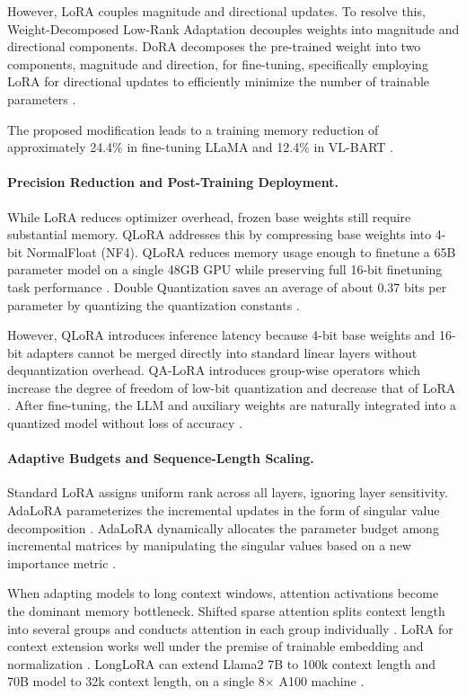 \documentclass[11pt,a4paper]{article}
\begin{document}
However, LoRA couples magnitude and directional updates. To resolve this, Weight-Decomposed Low-Rank Adaptation decouples weights into magnitude and directional components. DoRA decomposes the pre-trained weight into two components, magnitude and direction, for fine-tuning, specifically employing LoRA for directional updates to efficiently minimize the number of trainable parameters \cite{liu2024dora}.

The proposed modification leads to a training memory reduction of approximately 24.4\% in fine-tuning LLaMA and 12.4\% in VL-BART \cite{liu2024dora}.

\paragraph{Precision Reduction and Post-Training Deployment.}
While LoRA reduces optimizer overhead, frozen base weights still require substantial memory. QLoRA addresses this by compressing base weights into 4-bit NormalFloat (NF4). QLoRA reduces memory usage enough to finetune a 65B parameter model on a single 48GB GPU while preserving full 16-bit finetuning task performance \cite{dettmers2023qlora}. Double Quantization saves an average of about 0.37 bits per parameter by quantizing the quantization constants \cite{dettmers2023qlora}. 

However, QLoRA introduces inference latency because 4-bit base weights and 16-bit adapters cannot be merged directly into standard linear layers without dequantization overhead. QA-LoRA introduces group-wise operators which increase the degree of freedom of low-bit quantization and decrease that of LoRA \cite{xu2023qa}. After fine-tuning, the LLM and auxiliary weights are naturally integrated into a quantized model without loss of accuracy \cite{xu2023qa}.

\paragraph{Adaptive Budgets and Sequence-Length Scaling.}
Standard LoRA assigns uniform rank across all layers, ignoring layer sensitivity. AdaLoRA parameterizes the incremental updates in the form of singular value decomposition \cite{zhang2023adalora}. AdaLoRA dynamically allocates the parameter budget among incremental matrices by manipulating the singular values based on a new importance metric \cite{zhang2023adalora}.

When adapting models to long context windows, attention activations become the dominant memory bottleneck. Shifted sparse attention splits context length into several groups and conducts attention in each group individually \cite{chen2023longlora}. LoRA for context extension works well under the premise of trainable embedding and normalization \cite{chen2023longlora}. LongLoRA can extend Llama2 7B to 100k context length and 70B model to 32k context length, on a single 8× A100 machine \cite{chen2023longlora}.
\end{document}
